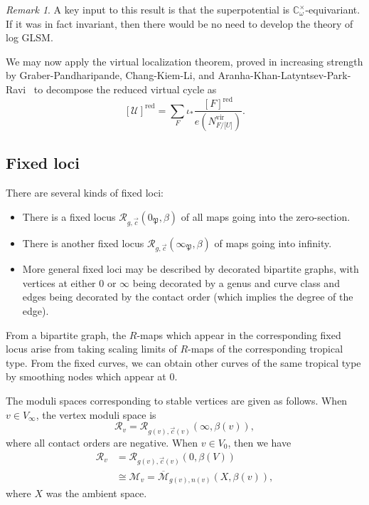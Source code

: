 \documentclass[10pt]{amsart}
\theoremstyle{definition}
\theoremstyle{remark}
\newtheorem{rmk}[thm]{Remark}
\theoremstyle{plain}
\theoremstyle{definition}
\theoremstyle{remark}
\newcommand{\C}{\mathbb{C}}
\newcommand{\Mbar}{\overline{\mathcal{M}}}
\newcommand{\mc}[1]{\mathcal{#1}}
\newcommand{\mf}[1]{\mathfrak{#1}}
\newcommand{\mr}[1]{\mathrm{#1}}
\newcommand{\1}{\mathbf{1}}
\newcommand{\2}{\mathbf{2}}
\newcommand{\3}{\mathbf{3}}
\newcommand{\vir}{\mr{vir}}
\newcommand{\red}{\mr{red}}
\begin{document}
\begin{rmk}
    A key input to this result is that the superpotential is $\C_{\omega}^{\times}$-equivariant. If it was in fact invariant, then there would be no need to develop the theory of log GLSM.
\end{rmk}

We may now apply the virtual localization theorem, proved in increasing strength by Graber-Pandharipande, Chang-Kiem-Li, and Aranha-Khan-Latyntsev-Park-Ravi~\cite{virtloc,locwccosection,virtloc2} to decompose the reduced virtual cycle as
\[ [\mc{U}]^{\red} = \sum_F \iota_* \frac{[F]^{\red}}{e(N_{F/\mc[U]}^{\vir})}. \]


\subsection{Fixed loci}%
\label{sub:Fixed loci}

There are several kinds of fixed loci:
\begin{itemize}
    \item There is a fixed locus $\mc{R}_{g,\vec{c}}(0_{\mf{P}}, \beta)$ of all maps going into the zero-section.
    \item There is another fixed locus $\mc{R}_{g,\vec{c}}(\infty_{\mf{P}}, \beta)$ of maps going into infinity.
    \item More general fixed loci may be described by decorated bipartite graphs, with vertices at either $0$ or $\infty$ being decorated by a genus and curve class and edges being decorated by the contact order (which implies the degree of the edge).
\end{itemize}
From a bipartite graph, the $R$-maps which appear in the corresponding fixed locus arise from taking scaling limits of $R$-maps of the corresponding tropical type. From the fixed curves, we can obtain other curves of the same tropical type by smoothing nodes which appear at $0$.

The moduli spaces corresponding to stable vertices are given as follows. When $v \in V_{\infty}$, the vertex moduli space is
\[ \mc{R}_v = \mc{R}_{g(v), \vec{c}(v)}(\infty, \beta(v)), \]
where all contact orders are negative. When $v \in V_0$, then we have
\begin{align*}
    \mc{R}_v &= \mc{R}_{g(v), \vec{c}(v)}(0, \beta(V)) \\
    &\cong \mc{M}_v = \Mbar_{g(v), n(v)} (X, \beta(v)),
\end{align*}
where $X$ was the ambient space.
\end{document}
